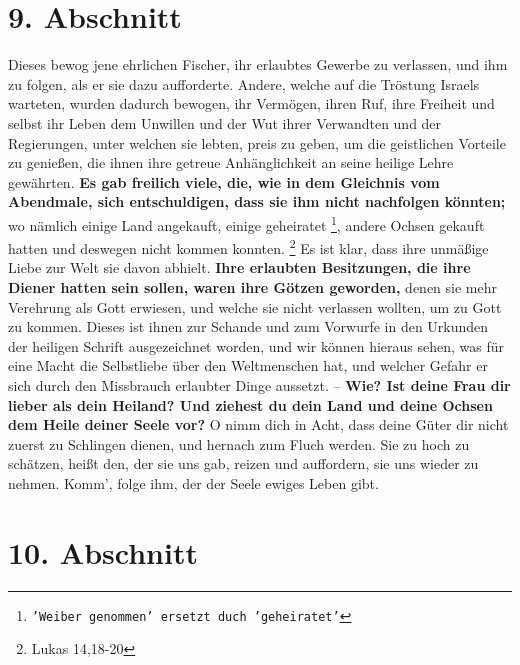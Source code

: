 \section{9. Abschnitt} \label{kap4_ab9}

Dieses bewog jene ehrlichen Fischer, ihr erlaubtes Gewerbe zu verlassen, und ihm
zu folgen, als er sie dazu aufforderte. Andere, welche auf die Tröstung Israels
warteten, wurden dadurch bewogen, ihr Vermögen, ihren Ruf, ihre Freiheit und
selbst ihr Leben dem Unwillen und der Wut ihrer Verwandten und der
Regierungen, unter welchen sie lebten, preis zu geben, um die geistlichen
Vorteile zu genießen, die ihnen ihre getreue Anhänglichkeit an seine heilige
Lehre gewährten. \textbf{Es gab freilich viele, die, wie in dem Gleichnis vom
Abendmale, sich entschuldigen, dass sie ihm nicht nachfolgen könnten;} wo
nämlich
einige Land angekauft, einige geheiratet \footnote{\texttt{'Weiber genommen' ersetzt
duch 'geheiratet'}}, andere Ochsen gekauft hatten und
deswegen nicht kommen konnten.
\footnote{Lukas  14,18-20}
Es ist klar, dass ihre 
unmäßige Liebe zur Welt sie davon abhielt. \textbf{Ihre erlaubten Besitzungen,
die ihre
Diener hatten sein sollen, waren ihre Götzen  geworden,} denen sie
mehr Verehrung
als Gott erwiesen, und welche sie nicht verlassen wollten, um zu Gott zu kommen.
Dieses ist ihnen zur Schande und zum Vorwurfe in den Urkunden der heiligen
Schrift ausgezeichnet worden, und wir können hieraus sehen, was für eine Macht
die Selbstliebe über den Weltmenschen hat, und welcher Gefahr er sich durch den
Missbrauch erlaubter Dinge aussetzt. -- \textbf{Wie? Ist deine Frau dir lieber
als dein
Heiland? Und ziehest du dein Land und deine Ochsen dem Heile deiner Seele vor?}
O
nimm dich in Acht, dass deine Güter dir nicht zuerst zu Schlingen dienen, und
hernach zum Fluch werden. Sie zu hoch zu schätzen, heißt den, der sie uns gab,
reizen und auffordern, sie uns wieder zu nehmen. Komm', folge ihm, der der Seele
ewiges Leben gibt.

\section{10. Abschnitt} \label{kap4_ab10}

